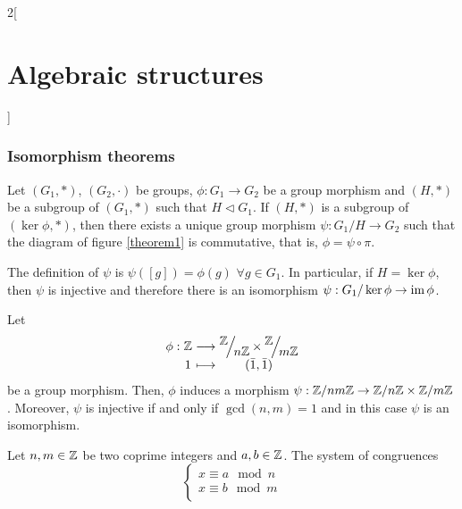 \documentclass[../../../main.tex]{subfiles}
\begin{document}
\begin{multicols}{2}[\section{Algebraic structures}]
  \subsubsection{Isomorphism theorems}
  \begin{theorem}
    Let $(G_1,*)$, $(G_2,\cdot)$ be groups, $\phi:G_1\rightarrow G_2$ be a group morphism and $(H,*)$ be a subgroup of $(G_1,*)$ such that $H\lhd G_1$. If $(H,*)$ is a subgroup of $(\ker\phi,*)$, then there exists a unique group morphism $\psi:G_1/H\rightarrow G_2$ such that the diagram of figure \ref{theorem1} is commutative, that is, $\phi=\psi\circ\pi$.
    \begin{center}
      \begin{minipage}{\linewidth}
        \centering
        
        \label{theorem1}
      \end{minipage}
    \end{center}
    The definition of $\psi$ is $\psi([g])=\phi(g)$ $\forall g\in G_1$.
    In particular, if $H=\ker\phi$, then $\psi$ is injective and therefore there is an isomorphism $\psi:G_1/\ker\phi\rightarrow\im\phi$.
  \end{theorem}
  \begin{theorem}
    Let
    \begin{equation*}
      \begin{array}{r@{\hspace{0.5\tabcolsep}}c@{\hspace{0.5\tabcolsep}}c@{\hspace{0.5\tabcolsep}}c}
        \phi: & \ZZ & \longrightarrow & \displaystyle\quot{\ZZ }{n\ZZ }\times\quot{\ZZ }{m\ZZ } \\
              & 1   & \longmapsto     & (\Bar{1},\Bar{1})
      \end{array}
    \end{equation*}
    be a group morphism. Then, $\phi$ induces a morphism $\psi:\ZZ /nm\ZZ \rightarrow\ZZ /n\ZZ \times\ZZ /m\ZZ $. Moreover, $\psi$ is injective if and only if $\gcd(n,m)=1$ and in this case $\psi$ is an isomorphism.
  \end{theorem}
  \begin{corollary}
    Let $n,m\in\ZZ $ be two coprime integers and $a,b\in\ZZ $. The system of congruences $$\left\{\begin{array}{l}
        x\equiv a\mod{n} \\
        x\equiv b\mod{m} \\

\end{array}$$
\end{corollary}
\end{multicols}
\end{document}

